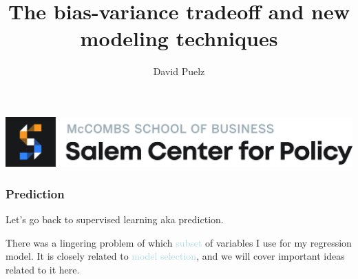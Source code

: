 \documentclass{beamer}
\title[]{\Large{The bias-variance tradeoff and new modeling techniques} \vspace{5mm}}
\author{David Puelz}
\institute[] %
{

}
\date{} %
\newcommand{\bo}[1]{\textcolor{burntorange}{#1}}
\newcommand{\lb}[1]{\textcolor{lightblue}{#1}}
\newcommand{\sk}{\vspace{.5cm}}
\begin{document}
{
\begin{frame}[noframenumbering]
\vspace{12mm}
\centerline{\includegraphics[scale=0.075]{salem-banner}}
\vspace{5mm}
\titlepage %
\end{frame}
}







\begin{frame}[plain]
\frametitle{Prediction}


Let's go back to supervised learning aka \bo{prediction}. \\  \sk\sk

There was a lingering problem of which \lb{subset} of variables I use for my regression model.  It is closely related to \lb{model selection}, and we will cover important ideas related to it here.

 

\end{frame}
\end{document}
